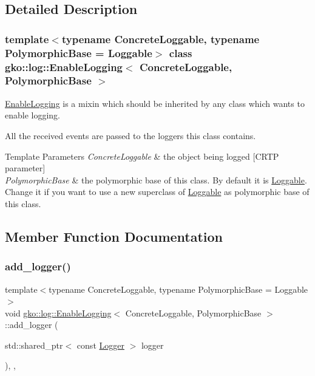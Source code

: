 \subsection{Detailed Description}
\subsubsection*{template$<$typename Concrete\+Loggable, typename Polymorphic\+Base = Loggable$>$\newline
class gko\+::log\+::\+Enable\+Logging$<$ Concrete\+Loggable, Polymorphic\+Base $>$}

\hyperlink{classgko_1_1log_1_1EnableLogging}{Enable\+Logging} is a mixin which should be inherited by any class which wants to enable logging. 

All the received events are passed to the loggers this class contains.


\begin{DoxyTemplParams}{Template Parameters}
{\em Concrete\+Loggable} & the object being logged \mbox{[}C\+R\+TP parameter\mbox{]}\\
\hline
{\em Polymorphic\+Base} & the polymorphic base of this class. By default it is \hyperlink{classgko_1_1log_1_1Loggable}{Loggable}. Change it if you want to use a new superclass of {\ttfamily \hyperlink{classgko_1_1log_1_1Loggable}{Loggable}} as polymorphic base of this class. \\
\hline
\end{DoxyTemplParams}


\subsection{Member Function Documentation}
\mbox{\label{classgko_1_1log_1_1EnableLogging_a7b3493c14a37b4d46487d9c636d784f2}} 
\subsubsection{\texorpdfstring{add\+\_\+logger()}{add\_logger()}}
{\footnotesize\ttfamily template$<$typename Concrete\+Loggable, typename Polymorphic\+Base = Loggable$>$ \\
void \hyperlink{classgko_1_1log_1_1EnableLogging}{gko\+::log\+::\+Enable\+Logging}$<$ Concrete\+Loggable, Polymorphic\+Base $>$\+::add\+\_\+logger (\begin{DoxyParamCaption}\item[{std\+::shared\+\_\+ptr$<$ const \hyperlink{classgko_1_1log_1_1Logger}{Logger} $>$}]{logger }\end{DoxyParamCaption})\hspace{0.3cm}{\ttfamily [inline]}, {\ttfamily [override]}, {\ttfamily [virtual]}}



